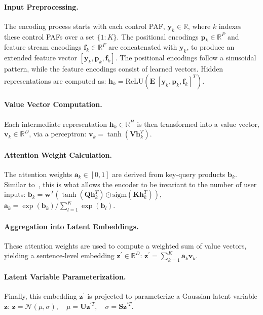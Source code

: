 \documentclass[a4paper,12pt,twoside,openright]{article}
\begin{document}
\paragraph{Input Preprocessing.} The encoding process starts with each control PAF, \(\mathbf{y}_k \in \mathbb{R}\), where \(k\) indexes these control PAFs over a set \(\{1:K\}\). The positional encodings \(\mathbf{p}_k \in \mathbb{R}^P\) and feature stream encodings \(\mathbf{f}_k \in \mathbb{R}^F\) are concatenated with \(\mathbf{y}_k\), to produce an extended feature vector \([ \mathbf{y}_k, \mathbf{p}_k, \mathbf{f}_k ]\). The positional encodings follow a sinusoidal pattern, while the feature encodings consist of learned vectors. Hidden representations are computed as: $\mathbf{h}_k = \mathrm{ReLU} \left( \mathbf{E} ~ [ \mathbf{y}_k, \mathbf{p}_k, \mathbf{f}_k ]^T \right)$.

\paragraph{Value Vector Computation.} Each intermediate representation \(\mathbf{h}_k \in \mathbb{R}^H\) is then transformed into a value vector, \(\mathbf{v}_k \in \mathbb{R}^D\), via a perceptron: $\mathbf{v}_k = \tanh \left( \mathbf{V} \mathbf{h}_k^T \right)$.

\paragraph{Attention Weight Calculation.} The attention weights \(\mathbf{a}_k \in [0, 1]\) are derived from key-query products \(\mathbf{b}_k\). Similar to~\parencite{Ilse2018AttentionbasedDM}, this is what allows the encoder to be invariant to the number of user inputs: $\mathbf{b}_k = \mathbf{w}^T \left( \tanh \left( \mathbf{Q} \mathbf{h}_k^T \right) \odot \mathrm{sigm} \left( \mathbf{K} \mathbf{h}_k^T \right) \right)$, $\mathbf{a}_k = \exp \left( \mathbf{b}_k \right) / \sum_{l=1}^{K} \exp \left( \mathbf{b}_l \right)$.

\paragraph{Aggregation into Latent Embeddings.} These attention weights are used to compute a weighted sum of value vectors, yielding a sentence-level embedding \(\mathbf{z}^\prime \in \mathbb{R}^D\): $\mathbf{z}^\prime = \sum_{k=1}^{K} \mathbf{a}_k \mathbf{v}_k$.

\paragraph{Latent Variable Parameterization.} Finally, this embedding \(\mathbf{z}^\prime\) is projected to parameterize a Gaussian latent variable \(\mathbf{z}\): $
\mathbf{z} = \mathcal{N} \left( \mu, \sigma \right), \quad \mu = \mathbf{U} \mathbf{z}^{\prime T}, \quad \sigma = \mathbf{S} \mathbf{z}^{\prime T}$.
\end{document}
